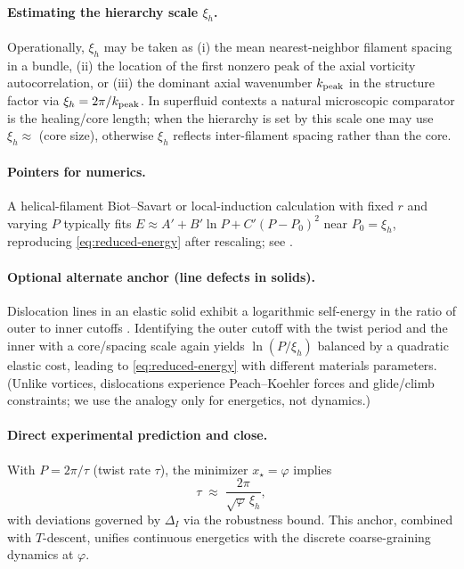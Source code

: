 \documentclass[11pt]{article}
\theoremstyle{remark}
\theoremstyle{definition}
\begin{document}
\paragraph{Estimating the hierarchy scale $\xi_h$.}
Operationally, $\xi_h$ may be taken as (i) the mean nearest-neighbor filament spacing in a bundle, (ii) the location of the first nonzero peak of the axial vorticity autocorrelation, or (iii) the dominant axial wavenumber $k_{\rm peak}$ in the structure factor via $\xi_h=2\pi/k_{\rm peak}$. In superfluid contexts a natural microscopic comparator is the healing/core length; when the hierarchy is set by this scale one may use $\xi_h\approx$ (core size), otherwise $\xi_h$ reflects inter-filament spacing rather than the core.

\paragraph{Pointers for numerics.}
A helical-filament Biot–Savart or local-induction calculation with fixed $r$ and varying $P$ typically fits $E \approx A' + B'\ln P + C'(P-P_0)^2$ near $P_0=\xi_h$, reproducing \cref{eq:reduced-energy} after rescaling; see \cite{Widnall1972,Hardin1982,FukumotoOkulov2005,Betchov1965,KleinMajdaDamodaran1995}.

\paragraph{Optional alternate anchor (line defects in solids).}
Dislocation lines in an elastic solid exhibit a logarithmic self-energy in the ratio of outer to inner cutoffs \cite{HirthLothe}. Identifying the outer cutoff with the twist period and the inner with a core/spacing scale again yields $\ln(P/\xi_h)$ balanced by a quadratic elastic cost, leading to \cref{eq:reduced-energy} with different materials parameters. (Unlike vortices, dislocations experience Peach–Koehler forces and glide/climb constraints; we use the analogy only for energetics, not dynamics.)

\paragraph{Direct experimental prediction and close.}
With $P=2\pi/\tau$ (twist rate $\tau$), the minimizer $x_\star=\varphi$ implies
\[
\tau \;\approx\; \frac{2\pi}{\sqrt{\varphi}\,\xi_h},
\]
with deviations governed by $\Delta_I$ via the robustness bound. This anchor, combined with $T$-descent, unifies continuous energetics with the discrete coarse-graining dynamics at $\varphi$.
\end{document}
